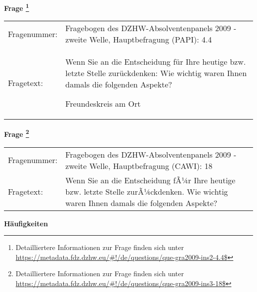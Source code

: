 				\vspace*{0.5cm}
                \noindent\textbf{Frage
	                \footnote{Detailliertere Informationen zur Frage finden sich unter
		              \url{https://metadata.fdz.dzhw.eu/\#!/de/questions/que-gra2009-ins2-4.4$}}}\\
				\begin{tabularx}{\hsize}{@{}lX}
					Fragenummer: &
					  Fragebogen des DZHW-Absolventenpanels 2009 - zweite Welle, Hauptbefragung (PAPI):
					  4.4
 \\
					Fragetext: & Wenn Sie an die Entscheidung für Ihre heutige bzw. letzte Stelle zurückdenken: Wie wichtig waren Ihnen damals die folgenden Aspekte?\par  Freundeskreis am Ort \\
				\end{tabularx}
				\vspace*{0.5cm}
                \noindent\textbf{Frage
	                \footnote{Detailliertere Informationen zur Frage finden sich unter
		              \url{https://metadata.fdz.dzhw.eu/\#!/de/questions/que-gra2009-ins3-18$}}}\\
				\begin{tabularx}{\hsize}{@{}lX}
					Fragenummer: &
					  Fragebogen des DZHW-Absolventenpanels 2009 - zweite Welle, Hauptbefragung (CAWI):
					  18
 \\
					Fragetext: & Wenn Sie an die Entscheidung fÃ¼r Ihre heutige bzw. letzte Stelle zurÃ¼ckdenken. Wie wichtig waren Ihnen damals die folgenden Aspekte? \\
				\end{tabularx}





        		\vspace*{0.5cm}
                \noindent\textbf{Häufigkeiten}

